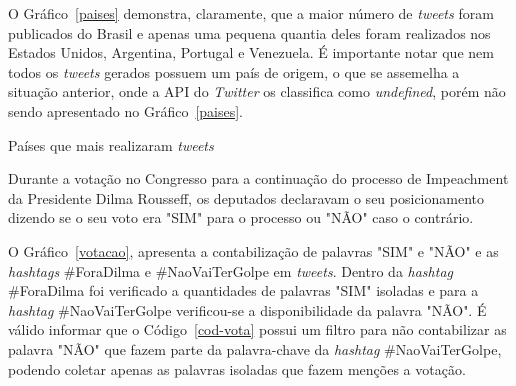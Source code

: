 O Gráfico~\ref{paises} demonstra, claramente, que a maior número de \textit{tweets} foram publicados do Brasil e apenas uma pequena quantia deles foram realizados nos Estados Unidos, Argentina, Portugal e Venezuela. É importante notar que nem todos os \textit{tweets} gerados possuem um país de origem, o que se assemelha a situação anterior, onde a API do \textit{Twitter} os classifica como \textit{undefined}, porém não sendo apresentado no Gráfico~\ref{paises}.

\begin{grafico}[h]
	\centering
	\vspace{-0.2cm}
	\caption{Países que mais realizaram \textit{tweets}}
	\label{paises}
\end{grafico}

Durante a votação no Congresso para a continuação do processo de Impeachment da Presidente Dilma Rousseff, os deputados declaravam o seu posicionamento dizendo se o seu voto era "SIM" \space para o processo ou "NÃO" \space caso o contrário.

O Gráfico~\ref{votacao}, apresenta a contabilização de palavras "SIM" \space e "NÃO" \space e as \textit{hashtags} \#ForaDilma e \#NaoVaiTerGolpe em \textit{tweets}. Dentro da \textit{hashtag} \#ForaDilma foi verificado a quantidades de palavras "SIM" \space isoladas e para a \textit{hashtag} \#NaoVaiTerGolpe verificou-se a disponibilidade da palavra "NÃO". É válido informar que o Código~\ref{cod-vota} possui um filtro para não contabilizar as palavra "NÃO" \space que fazem parte da palavra-chave da \textit{hashtag} \#NaoVaiTerGolpe, podendo coletar apenas as palavras isoladas que fazem menções a votação. \\ \\ \\ \\ \\ \\

